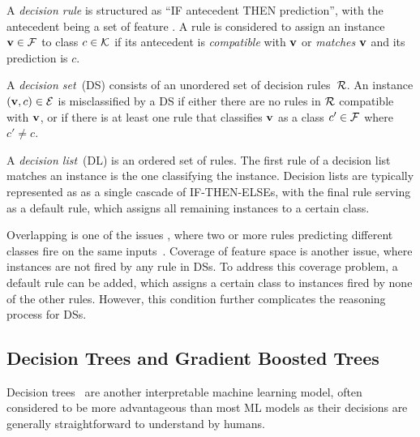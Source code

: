 A \emph{decision rule} is structured as ``IF antecedent THEN
prediction'', with the antecedent being a set of feature .
%
A rule is considered to assign an instance $\mathbf{v}\in{\mathcal{F}}$
to class $c\in{\mathcal{K}}$ if its antecedent is \emph{compatible} with
$\mathbf{v}$ or \emph{matches} $\mathbf{v}$ and its prediction is $c$.

A \emph{decision set}~(DS) consists of an unordered set 
of decision rules~${\mathcal{R}}$.
%
An instance $(\mathbf{v},c)\in{\mathcal{E}}$ is misclassified by a DS if either
there are no rules in ${\mathcal{R}}$ compatible with $\mathbf{v}$, or if there 
is at least one rule that classifies $\mathbf{v}$ as a class $c'\in{\mathcal{F}}$
where $c'\neq c$.

A \emph{decision list}~(DL) is an ordered set of rules. 
%
The first rule of a decision list matches an instance is the one classifying the instance.
%
Decision lists are typically represented as as a single cascade of 
IF-THEN-ELSEs, with the final rule serving as a default rule, 
which assigns all remaining instances to a certain class.

%
Overlapping is one of the issues , where two or more rules predicting
different classes fire on the same inputs~\cite{ms-rw22,msi-fai23}. 
%
Coverage of feature space is another issue, where instances are not
fired by any rule in DSs.
%
To address this coverage problem, a default rule can be added, which 
assigns a certain class to instances fired by none of the other rules.
%
However, this condition further complicates the
reasoning process for DSs.

\subsection{Decision Trees and Gradient Boosted Trees}
Decision trees~\cite{rivest-ipl76,breiman-bk84,quinlan-bk93,quinlan-ml86}
are another interpretable machine learning model, often considered to be
more advantageous than most ML models as their decisions are generally
straightforward to understand by humans.

